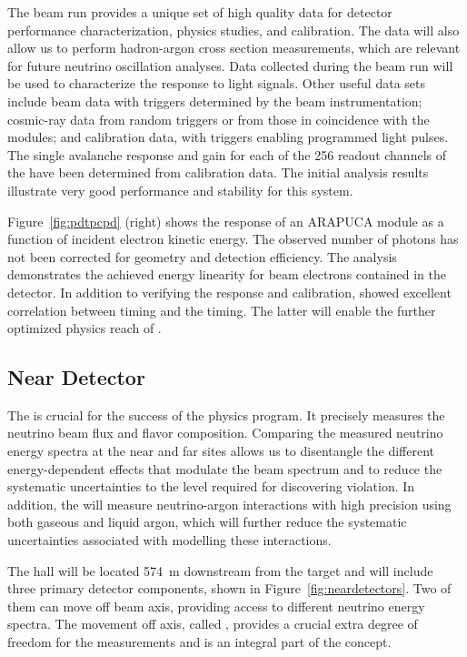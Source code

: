 The  beam run provides a unique set of high quality data for detector performance characterization, physics studies, and calibration. The data will also
allow us to perform hadron-argon cross section measurements, which are relevant for future  neutrino oscillation analyses.
Data collected during the beam run will be used to characterize the  response to light signals. Other useful data sets include
beam data with triggers determined by the beam instrumentation; cosmic-ray data  from random triggers or from those in coincidence with the  modules; and calibration data, with triggers enabling programmed light pulses. 
The single avalanche response and gain for each of the 256 readout channels of the  have been determined from calibration data.
The initial analysis results illustrate very good performance and stability for this system.

Figure~\ref{fig:pdtpcpd} (right) shows the response of an %
ARAPUCA  module as a function of incident electron kinetic energy.
The observed number of photons has not been corrected for geometry and detection efficiency. The analysis demonstrates the achieved energy linearity for beam electrons contained in the detector.  
In addition to verifying the  response and calibration,  showed excellent correlation between  timing and the  timing. The latter will enable the further optimized physics reach of . 


\subsection{Near Detector}
\label{sec:nd-verview}


The   is crucial for the success of the  physics program. It precisely measures the neutrino beam flux and flavor composition. Comparing the measured neutrino energy spectra at the near and far sites allows us to disentangle the different energy-dependent effects that modulate the beam spectrum and to reduce the systematic uncertainties to the level required for discovering  violation. In addition, the  will measure neutrino-argon interactions with high precision using both gaseous and liquid argon, which will further reduce the systematic uncertainties associated with modelling these interactions.


The  hall will be located \SI{574}{m} downstream from the target and will include three primary detector components, shown in Figure~\ref{fig:neardetectors}. Two of them can move off beam axis, providing access to different neutrino energy spectra. The movement off axis, called , provides a crucial extra degree of freedom for the  measurements and is an integral part of the   concept. 


